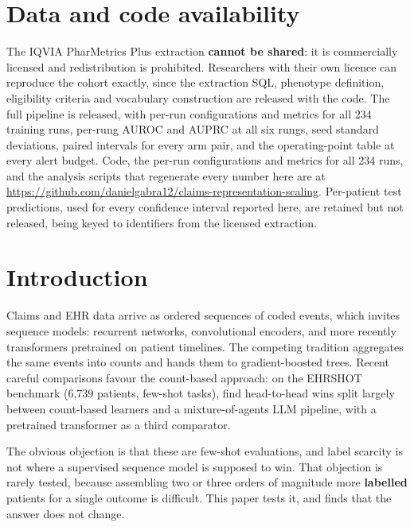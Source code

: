\documentclass[10pt,twocolumn,letterpaper]{article}
\begin{document}
\section*{Data and code availability}



The IQVIA PharMetrics Plus extraction \textbf{cannot be shared}: it is commercially licensed and redistribution is prohibited. Researchers with their own licence can reproduce the cohort exactly, since the extraction SQL, phenotype definition, eligibility criteria and vocabulary construction are released with the code. The full pipeline is released, with per-run configurations and metrics for all 234 training runs, per-rung AUROC and AUPRC at all six rungs, seed standard deviations, paired intervals for every arm pair, and the operating-point table at every alert budget. Code, the per-run configurations and metrics for all 234 runs, and the analysis scripts that regenerate every number here are at \url{https://github.com/danielgabra12/claims-representation-scaling}. Per-patient test predictions, used for every confidence interval reported here, are retained but not released, being keyed to identifiers from the licensed extraction.



\section{Introduction}\label{sec:1}



Claims and EHR data arrive as ordered sequences of coded events, which invites sequence models: recurrent networks, convolutional encoders, and more recently transformers pretrained on patient timelines. The competing tradition aggregates the same events into counts and hands them to gradient-boosted trees. Recent careful comparisons favour the count-based approach: on the EHRSHOT benchmark (6,739 patients, few-shot tasks), \citet{gao2025countbased} find head-to-head wins split largely between count-based learners and a mixture-of-agents LLM pipeline, with a pretrained transformer as a third comparator.



The obvious objection is that these are few-shot evaluations, and label scarcity is not where a supervised sequence model is supposed to win. That objection is rarely tested, because assembling two or three orders of magnitude more \textbf{labelled} patients for a single outcome is difficult. This paper tests it, and finds that the answer does not change.
\end{document}
